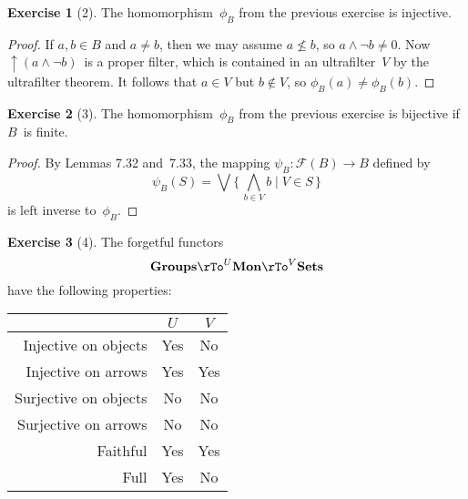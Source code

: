 \documentclass[letterpaper,12pt]{article}
\newcommand{\meet}{\wedge}
\newcommand{\bigmeet}{\bigwedge}
\newcommand{\bigjoin}{\bigvee}
\newcommand{\compl}{\lnot}
\DeclareMathOperator{\up}{\uparrow}
\newcommand{\cat}[1]{\mathbf{#1}}
\newcommand{\2}{\cat{2}}
\newcommand{\Sets}{\cat{Sets}}
\newcommand{\Mon}{\cat{Mon}}
\newcommand{\Grp}{\cat{Groups}}
\theoremstyle{definition}
\newtheorem*{exer}{Exercise}
\theoremstyle{remark}
\theoremstyle{direction}
\begin{document}
\begin{exer}[2]
The homomorphism~\(\phi_B\) from the previous exercise is injective.
\end{exer}
\begin{proof}
If \(a,b\in B\) and \(a\ne b\), then we may assume \(a\not\le b\), so \(a\meet\compl b\ne 0\). Now \(\up(a\meet\compl b)\)~is a proper filter, which is contained in an ultrafilter~\(V\) by the ultrafilter theorem. It follows that \(a\in V\) but \(b\not\in V\), so \(\phi_B(a)\ne\phi_B(b)\).
\end{proof}

\begin{exer}[3]
The homomorphism~\(\phi_B\) from the previous exercise is bijective if \(B\)~is finite.
\end{exer}
\begin{proof}
By Lemmas 7.32 and~7.33, the mapping \(\psi_B:\mathcal{F}(B)\to B\) defined by
\[\psi_B(S)=\bigjoin\{\,\bigmeet_{b\in V}b\mid V\in S\,\}\]
is left inverse to~\(\phi_B\).
\end{proof}

\begin{exer}[4]
The forgetful functors
\[\Grp\rTo^{U}\Mon\rTo^{V}\Sets\]
have the following properties:
\begin{center}
\begin{tabular}{|r|c|c|}
\hline
						&\(U\)	&\(V\)\\
\hline
Injective on objects	&Yes	&No\\
Injective on arrows		&Yes	&Yes\\
Surjective on objects	&No		&No\\
Surjective on arrows	&No		&No\\
Faithful				&Yes	&Yes\\
Full					&Yes	&No\\
\hline
\end{tabular}
\end{center}
\end{exer}
\end{document}
